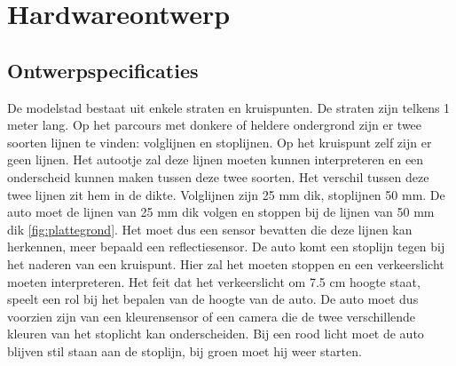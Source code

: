 \documentclass[a4paper,twoside,kulak]{kulakreport} %
\begin{document}
\section{Hardwareontwerp} \label{Hardwareontwerp}

\subsection{Ontwerpspecificaties} \label{Ontwerpspecificaties}


De modelstad bestaat uit enkele straten en kruispunten. De straten zijn telkens 1 meter lang. Op het parcours met donkere of heldere ondergrond zijn er twee soorten lijnen te vinden: volglijnen en stoplijnen. Op het kruispunt zelf zijn er geen lijnen. Het autootje zal deze lijnen moeten kunnen interpreteren en een onderscheid kunnen maken tussen deze twee soorten. Het verschil tussen deze twee lijnen zit hem in de dikte. Volglijnen zijn 25 mm dik, stoplijnen 50 mm. De auto moet de lijnen van 25 mm dik volgen en stoppen bij de lijnen van 50 mm dik \ref{fig:plattegrond}. Het moet dus een sensor bevatten die deze lijnen kan herkennen, meer bepaald een reflectiesensor. De auto komt een stoplijn tegen bij het naderen van een kruispunt. Hier zal het moeten stoppen en een verkeerslicht moeten interpreteren. Het feit dat het verkeerslicht om 7.5 cm hoogte staat, speelt een rol bij het bepalen van de hoogte van de auto. De auto moet dus voorzien zijn van een kleurensensor of een camera die de twee verschillende kleuren van het stoplicht kan onderscheiden. Bij een rood licht moet de auto blijven stil staan aan de stoplijn, bij groen moet hij weer starten.
\end{document}

